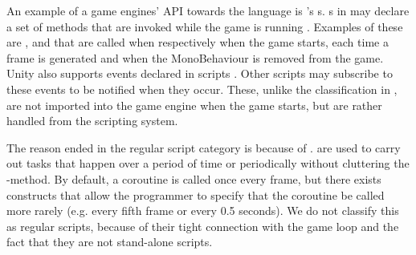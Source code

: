 

An example of a game engines' \ac{API} towards the language is \unity's s. s in \unityspace may declare a set of methods that are invoked while the game is running \cite{unity:monobehaviour}. Examples of these are ,  and  that are called when respectively when the game starts, each time a frame is generated and when the MonoBehaviour is removed from the game. Unity also supports events declared in scripts \cite{unity:event}. Other scripts may subscribe to these events to be notified when they occur. These, unlike the classification in \cite{5962102}, are not imported into the game engine when the game starts, but are rather handled from the scripting system.

The reason \unityspace ended in the regular script category is because of  \cite{unity:coroutines}.  are used to carry out tasks that happen over a period of time or periodically without cluttering the -method. By default, a coroutine is called once every frame, but there exists constructs that allow the programmer to specify that the coroutine be called more rarely (e.g. every fifth frame or every 0.5 seconds). We do not classify this as regular scripts, because of their tight connection with the game loop and the fact that they are not stand-alone scripts.